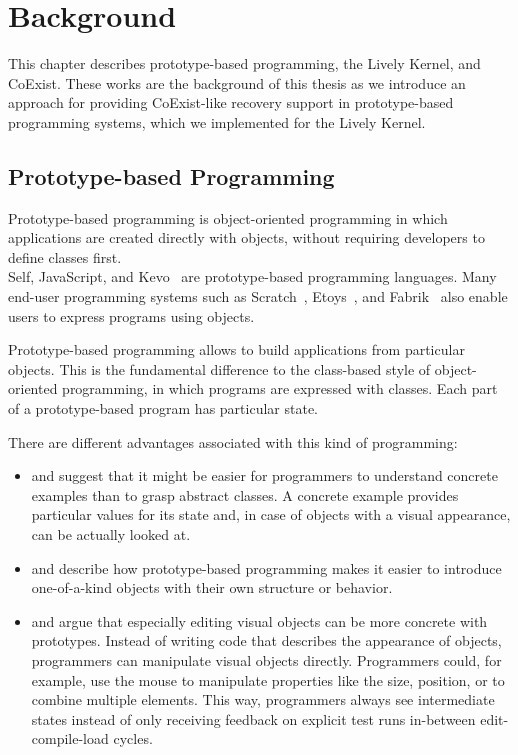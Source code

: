 \chapter{Background} \label{chapter:BACKGROUND}

This chapter describes prototype-based programming, the Lively Kernel, and CoExist.
These works are the background of this thesis as we introduce an approach for providing CoExist-like recovery support in prototype-based programming systems, which we implemented for the Lively Kernel.

\section{Prototype-based Programming}

Prototype-based programming is object-oriented programming in which applications are created directly with objects, without requiring developers to define classes first.\\
Self, JavaScript, and Kevo~\cite{Taivalsaari1992Kevo} are prototype-based programming languages.
Many end-user programming systems such as Scratch~\cite{Maloney2010SPL}, Etoys~\cite{Kay2005Etoys}, and Fabrik~\cite{Ingalls1988FVP} also enable users to express programs using objects.

Prototype-based programming allows to build applications from particular objects.
This is the fundamental difference to the class-based style of object-oriented programming, in which programs are expressed with classes.
Each part of a prototype-based program has particular state.

There are different advantages associated with this kind of programming:
\begin{itemize}
    \item \cite{Taivalsaari1996CVP} and \cite{Ungar1987SPS} suggest that it might be easier for programmers to understand concrete examples than to grasp abstract classes. A concrete example provides particular values for its state and, in case of objects with a visual appearance, can be actually looked at.
    \item \cite{Ungar1987SPS} and \cite{Borning1986CVP} describe how prototype-based programming makes it easier to introduce one-of-a-kind objects with their own structure or behavior.
    \item \cite{Borning1986CVP} and \cite{Maloney1995Mor} argue that especially editing visual objects can be more concrete with prototypes. Instead of writing code that describes the appearance of objects, programmers can manipulate visual objects directly. Programmers could, for example, use the mouse to manipulate properties like the size, position, or to combine multiple elements. This way, programmers always see intermediate states instead of only receiving feedback on explicit test runs in-between edit-compile-load cycles. 
\end{itemize}

